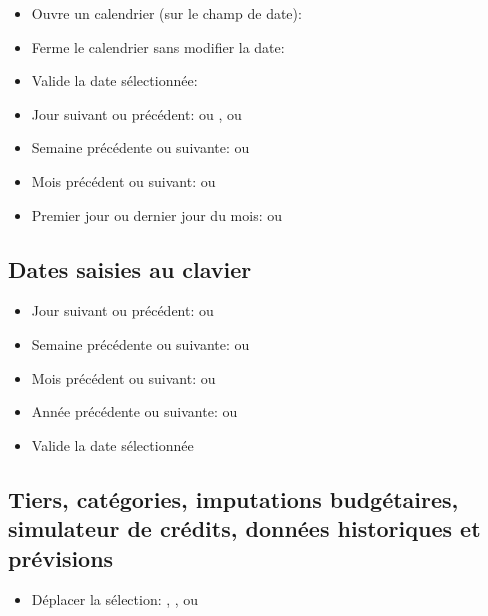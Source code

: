 \begin{itemize}
	\item Ouvre un calendrier (sur le champ de date): 
	\item Ferme le calendrier sans modifier la date: 
	\item Valide la date sélectionnée: 
	\item Jour suivant ou précédent: \key{+} ou \key{-},  ou 
	\item Semaine précédente ou suivante:  ou 
	\item Mois précédent ou suivant:  ou 
	\item Premier jour ou dernier jour du mois:  ou 
\end{itemize}


\subsection{Dates saisies au clavier}

\begin{itemize}
	\item Jour suivant ou précédent: \key{+} ou \key{-}
	\item Semaine précédente ou suivante:  \key{+} ou  \key{-}
	\item Mois précédent ou suivant:  ou 
	\item Année précédente ou suivante:   ou  
	\item Valide la date sélectionnée 
\end{itemize}


\subsection{Tiers, catégories, imputations budgétaires, simulateur de crédits, données historiques et prévisions}

\begin{itemize}
	\item Déplacer la sélection: , ,  ou 
\end{itemize}


